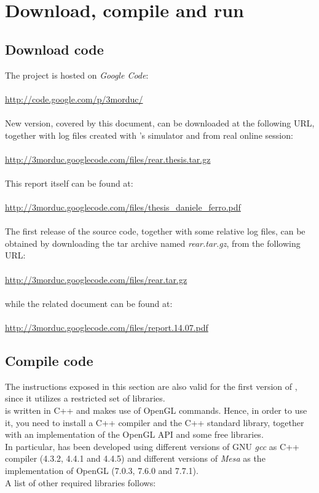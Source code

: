 \section{Download, compile and run \framework{}}
\label{sourcecode:downloadrun}

\subsection{Download code}
\label{sourcecode:downloadrun:download}

The \framework{} project is hosted on \textit{Google Code}:
\\
\\
\url{http://code.google.com/p/3morduc/}
\\
\\
New \framework{} version, covered by this document,
can be downloaded at the following URL, together with
log files created with \morduc{}'s simulator and from
real \morduc{} online session:
\\
\\
\url{http://3morduc.googlecode.com/files/rear.thesis.tar.gz}
\\
\\
This report itself can be found at:
\\
\\
\url{http://3morduc.googlecode.com/files/thesis_daniele_ferro.pdf}
\\
\\
The first release of the source code, together with
some relative log files, can be obtained by downloading
the tar archive named \textit{rear.tar.gz}, from the
following URL:
\\
\\
\url{http://3morduc.googlecode.com/files/rear.tar.gz}
\\
\\
while the related document can be found at:
\\
\\
\url{http://3morduc.googlecode.com/files/report.14.07.pdf}

\subsection{Compile code}
\label{sourcecode:downloadrun:compile}

The instructions exposed in this section are also valid for the
first version of \framework{}, since it utilizes a restricted
set of libraries.
\\
\framework{} is written in C++ and makes use of OpenGL commands.
Hence, in order to use it, you need to install a C++ compiler and the
C++ standard library, together with an implementation of the OpenGL
API and some free libraries.
\\
In particular, \framework{} has been developed using different versions
of GNU \textit{gcc} as
C++ compiler (4.3.2, 4.4.1 and 4.4.5) and different versions of 
\textit{Mesa} as the
implementation
of OpenGL (7.0.3, 7.6.0 and 7.7.1).
\\
A list of other required libraries follows:

